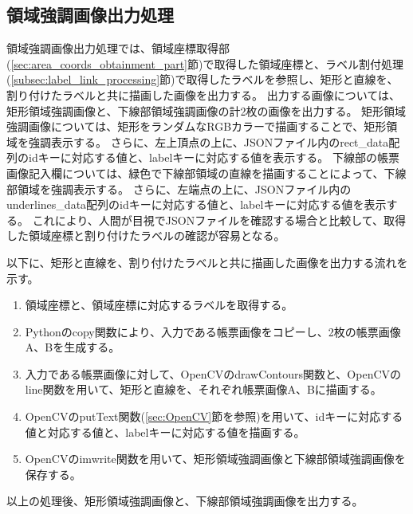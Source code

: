 \subsection{領域強調画像出力処理}\label{subsec:area_highlighted_image_output_processing}
領域強調画像出力処理では、領域座標取得部(\ref{sec:area_coords_obtainment_part}節)で取得した領域座標と、ラベル割付処理(\ref{subsec:label_link_processing}節)で取得したラベルを参照し、矩形と直線を、割り付けたラベルと共に描画した画像を出力する。
出力する画像については、矩形領域強調画像と、下線部領域強調画像の計2枚の画像を出力する。
矩形領域強調画像については、矩形をランダムなRGBカラーで描画することで、矩形領域を強調表示する。
さらに、左上頂点の上に、JSONファイル内のrect\_data配列のidキーに対応する値と、labelキーに対応する値を表示する。
下線部の帳票画像記入欄については、緑色で下線部領域の直線を描画することによって、下線部領域を強調表示する。
さらに、左端点の上に、JSONファイル内のunderlines\_data配列のidキーに対応する値と、labelキーに対応する値を表示する。
これにより、人間が目視でJSONファイルを確認する場合と比較して、取得した領域座標と割り付けたラベルの確認が容易となる。

以下に、矩形と直線を、割り付けたラベルと共に描画した画像を出力する流れを示す。

\begin{enumerate}
    \item 領域座標と、領域座標に対応するラベルを取得する。
    \item Pythonのcopy関数により、入力である帳票画像をコピーし、2枚の帳票画像A、Bを生成する。
    \item 入力である帳票画像に対して、OpenCVのdrawContours関数と、OpenCVのline関数を用いて、矩形と直線を、それぞれ帳票画像A、Bに描画する。
    \item OpenCVのputText関数(\ref{sec:OpenCV}節を参照)を用いて、idキーに対応する値と対応する値と、labelキーに対応する値を描画する。
    \item OpenCVのimwrite関数を用いて、矩形領域強調画像と下線部領域強調画像を保存する。
\end{enumerate}

以上の処理後、矩形領域強調画像と、下線部領域強調画像を出力する。